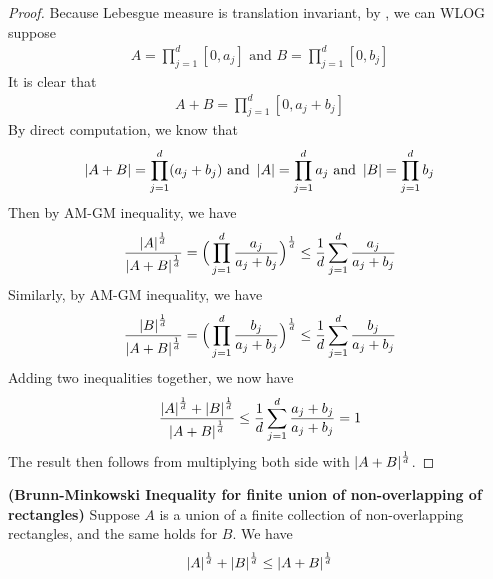 \documentclass{report}
\begin{document}
\begin{proof}
Because Lebesgue measure is translation invariant, by  , we can WLOG suppose 
\begin{align*}
A=\prod_{j=1}^d [0,a_j]\text{ and }B=\prod_{j=1}^d [0,b_j]
\end{align*}
It is clear that 
\begin{align*}
A+B= \prod_{j=1}^d [0,a_j+b_j]
\end{align*}
By direct computation, we know that 
\begin{align*}
\left|A+B\right|=\prod_{j=1}^d (a_j+b_j)\text{ and }\left|A\right|=\prod_{j=1}^d a_j\text{ and }\left|B\right|=\prod_{j=1}^d b_j
\end{align*}
Then by AM-GM inequality, we have 
\begin{align*}
\frac{\left|A\right|^{\frac{1}{d}}}{\left|A+B\right|^{\frac{1}{d}}}=\Big(\prod_{j=1}^d \frac{a_j}{a_j+b_j}\Big)^{\frac{1}{d}}\leq \frac{1}{d}\sum_{j=1}^d \frac{a_j}{a_j+b_j}
\end{align*}
Similarly, by AM-GM inequality, we have
\begin{align*}
\frac{\left|B\right|^{\frac{1}{d}}}{\left|A+B\right|^{\frac{1}{d}}}=\Big(\prod_{j=1}^d \frac{b_j}{a_j+b_j}\Big)^{\frac{1}{d}}\leq \frac{1}{d}\sum_{j=1}^d \frac{b_j}{a_j+b_j}
\end{align*}
Adding two inequalities together, we now have 
\begin{align*}
\frac{\left|A\right|^{\frac{1}{d}}+\left|B\right|^{\frac{1}{d}}}{\left|A+B\right|^{\frac{1}{d}}}\leq \frac{1}{d}\sum_{j=1}^d \frac{a_j+b_j}{a_j+b_j}=1
\end{align*}
The result then follows from multiplying both side with $\left|A+B\right|^{\frac{1}{d}}$. 
\end{proof}
\begin{theorem}
\label{BMIb}
\textbf{(Brunn-Minkowski Inequality for finite union of non-overlapping of rectangles)} Suppose $A$ is a union of a finite collection of non-overlapping rectangles, and the same holds for $B$. We have 
 \begin{align*}
\left|A\right|^{\frac{1}{d}}+ \left|B\right|^{\frac{1}{d}}\leq \left|A+B\right|^{\frac{1}{d}}
\end{align*}
\end{theorem}
\end{document}
